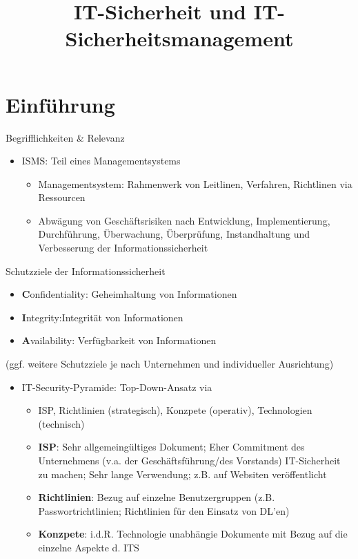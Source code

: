 \documentclass{cheatsheet}
\title{IT-Sicherheit und IT-Sicherheitsmanagement}
\begin{document}
    \section{Einführung}
    \begin{sectionbox}{Begrifflichkeiten \& Relevanz}
        \begin{itemize}
            \item ISMS: Teil eines Managementsystems
            \begin{itemize}
                \item Managementsystem: Rahmenwerk von Leitlinen, Verfahren, Richtlinen via Ressourcen
                \item Abwägung von Geschäftsrisiken nach Entwicklung, Implementierung, Durchführung, Überwachung, Überprüfung, Instandhaltung und Verbesserung der Informationssicherheit
            \end{itemize}
        \end{itemize}
        \begin{warningbox}{Schutzziele der Informationssicherheit}
            \begin{itemize}
                \item \textbf{C}onfidentiality: Geheimhaltung von Informationen
                \item \textbf{I}ntegrity:Integrität von Informationen
                \item \textbf{A}vailability: Verfügbarkeit von Informationen
            \end{itemize}
            (ggf. weitere Schutzziele je nach Unternehmen und individueller Ausrichtung)
        \end{warningbox}
        \begin{itemize}   
            \item IT-Security-Pyramide: Top-Down-Ansatz via 
            \begin{itemize}
                \item ISP, Richtlinien (strategisch), Konzpete (operativ), Technologien (technisch)
                \item \textbf{ISP}: Sehr allgemeingültiges Dokument; Eher Commitment des Unternehmens (v.a. der Geschäftsführung/des Vorstands) IT-Sicherheit zu machen; Sehr lange Verwendung; z.B. auf Websiten veröffentlicht
                \item \textbf{Richtlinien}: Bezug auf einzelne Benutzergruppen (z.B. Passwortrichtlinien; Richtlinien für den Einsatz von DL'en)
                \item \textbf{Konzpete}: i.d.R. Technologie unabhängie Dokumente mit Bezug auf die einzelne Aspekte d. ITS

\end{itemize}
\end{itemize}
\end{sectionbox}
\end{document}
